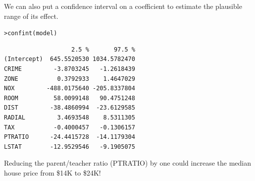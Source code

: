 \documentclass{beamer}\usepackage[]{graphicx}\usepackage[]{color}
\makeatletter
\newcommand{\hlstd}[1]{\textcolor[rgb]{1,0.894,0.769}{#1}}%
\newcommand{\hlkwd}[1]{\textcolor[rgb]{1,0.78,0.769}{#1}}%
\newenvironment{kframe}{%
 \def\at@end@of@kframe{}%
 \ifinner\ifhmode%
  \def\at@end@of@kframe{\end{minipage}}%
  \begin{minipage}{\columnwidth}%
 \fi\fi%
 \def\FrameCommand##1{\hskip\@totalleftmargin \hskip-\fboxsep
 \colorbox{shadecolor}{##1}\hskip-\fboxsep
     \hskip-\linewidth \hskip-\@totalleftmargin \hskip\columnwidth}%
 \MakeFramed {\advance\hsize-\width
   \@totalleftmargin\z@ \linewidth\hsize
   \@setminipage}}%
 {\par\unskip\endMakeFramed%
 \at@end@of@kframe}
\newenvironment{knitrout}{}{} %
\makeatother
\begin{document}
\begin{darkframes}
     
     
     \begin{frame}[fragile]%
      \fontsize{9}{9}\selectfont
        We can also put a confidence interval on a coefficient to estimate the plausible range of its effect.
        
\begin{knitrout}
\begin{kframe}
\begin{alltt}
\hlstd{> }\hlkwd{confint}\hlstd{(model)}
\end{alltt}
\begin{verbatim}
                   2.5 %       97.5 %
(Intercept)  645.5520530 1034.5782470
CRIME         -3.8703245   -1.2618439
ZONE           0.3792933    1.4647029
NOX         -488.0175640 -205.8337804
ROOM          58.0099148   90.4751248
DIST         -38.4860994  -23.6129585
RADIAL         3.4693548    8.5311305
TAX           -0.4000457   -0.1306157
PTRATIO      -24.4415728  -14.1179304
LSTAT        -12.9529546   -9.1905075
\end{verbatim}
\end{kframe}
\end{knitrout}
     
        \pause
        Reducing the parent/teacher ratio (PTRATIO) by one could increase the median house price from \$14K to \$24K!
        
        \lc
     \end{frame}
        
        
 
  \end{darkframes}
\end{document}
